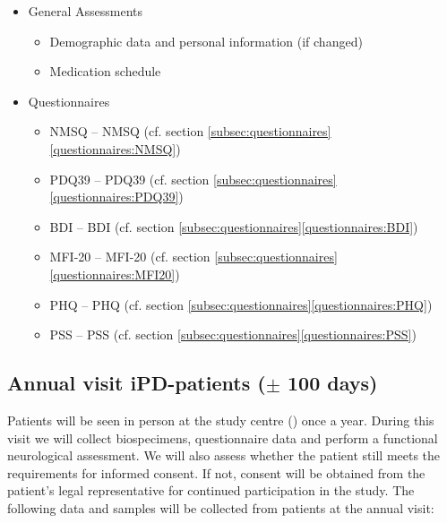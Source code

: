 \begin{itemize}[noitemsep,topsep=0pt]
\item General Assessments
\begin{itemize}[noitemsep,topsep=0pt]
\item Demographic data and personal information (if changed)
\item Medication schedule
\end{itemize}
\item Questionnaires
\begin{itemize}[noitemsep,topsep=0pt]
\item \acl{NMSQ} -- \acs{NMSQ} (cf. section \ref{subsec:questionnaires}\ref{questionnaires:NMSQ})
\item \acl{PDQ39} -- \acs{PDQ39} (cf. section \ref{subsec:questionnaires}\ref{questionnaires:PDQ39})
\item \acl{BDI} -- \acs{BDI} (cf. section \ref{subsec:questionnaires}\ref{questionnaires:BDI})
\item \acl{MFI-20} -- \acs{MFI-20} (cf. section \ref{subsec:questionnaires}\ref{questionnaires:MFI20})
\item \acl{PHQ} -- \acs{PHQ} (cf. section \ref{subsec:questionnaires}\ref{questionnaires:PHQ})
\item \acl{PSS} -- \acs{PSS} (cf. section \ref{subsec:questionnaires}\ref{questionnaires:PSS})
\end{itemize}
\end{itemize}

\subsection{Annual visit \ac{iPD}-patients ($\pm$ 100 days)}
Patients will be seen in person at the study centre (\UKM{}) once a year. During this visit we will collect biospecimens, questionnaire data and perform a functional neurological assessment. We will also assess whether the patient still meets the requirements for informed consent. If not, consent will be obtained from the patient's legal representative for continued participation in the study. The following data and samples will be collected from patients at the annual visit:

